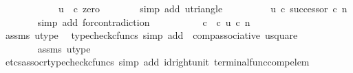 \begin{isabellebody}
\ \ \isamarkupfalse%
\ {\isacharminus}{\kern0pt}\isanewline
\ \ \ \ \isamarkupfalse%
\ {\isachardoublequoteopen}{\isasymt}\ {\isacharequal}{\kern0pt}\ u\ \ {\isasymcirc}\isactrlsub c\ zero{\isachardoublequoteclose}\isanewline
\ \ \ \ \ \ \isamarkupfalse%
\ {\isacharparenleft}{\kern0pt}simp\ add{\isacharcolon}{\kern0pt}\ u{\isacharunderscore}{\kern0pt}triangle{\isacharparenright}{\kern0pt}\isanewline
\ \ \ \ \isamarkupfalse%
\ \isamarkupfalse%
\ {\isachardoublequoteopen}{\isachardot}{\kern0pt}{\isachardot}{\kern0pt}{\isachardot}{\kern0pt}\ {\isacharequal}{\kern0pt}\ u\ {\isasymcirc}\isactrlsub c\ successor\ {\isasymcirc}\isactrlsub c\ n{\isachardoublequoteclose}\isanewline
\ \ \ \ \ \ \isamarkupfalse%
\ {\isacharparenleft}{\kern0pt}simp\ add{\isacharcolon}{\kern0pt}\ for{\isacharunderscore}{\kern0pt}contradiction{\isacharparenright}{\kern0pt}\isanewline
\ \ \ \ \isamarkupfalse%
\ \isamarkupfalse%
\ {\isachardoublequoteopen}{\isachardot}{\kern0pt}{\isachardot}{\kern0pt}{\isachardot}{\kern0pt}\ {\isacharequal}{\kern0pt}\ {\isacharparenleft}{\kern0pt}{\isasymf}\ {\isasymcirc}\isactrlsub c\ {\isasymbeta}\isactrlbsub {\isasymOmega}\isactrlesub {\isacharparenright}{\kern0pt}\ {\isasymcirc}\isactrlsub c\ u\ {\isasymcirc}\isactrlsub c\ n{\isachardoublequoteclose}\isanewline
\ \ \ \ \ \ \isamarkupfalse%
\ assms\ u{\isacharunderscore}{\kern0pt}type\ \isamarkupfalse%
\ {\isacharparenleft}{\kern0pt}typecheck{\isacharunderscore}{\kern0pt}cfuncs{\isacharcomma}{\kern0pt}\ simp\ add{\isacharcolon}{\kern0pt}\ \ comp{\isacharunderscore}{\kern0pt}associative{}\ u{\isacharunderscore}{\kern0pt}square{\isacharparenright}{\kern0pt}\isanewline
\ \ \ \ \isamarkupfalse%
\ \isamarkupfalse%
\ {\isachardoublequoteopen}{\isachardot}{\kern0pt}{\isachardot}{\kern0pt}{\isachardot}{\kern0pt}\ {\isacharequal}{\kern0pt}\ {\isasymf}{\isachardoublequoteclose}\isanewline
\ \ \ \ \ \ \isamarkupfalse%
\ assms\ u{\isacharunderscore}{\kern0pt}type\ \isamarkupfalse%
\ {\isacharparenleft}{\kern0pt}etcs{\isacharunderscore}{\kern0pt}assocr{\isacharcomma}{\kern0pt}typecheck{\isacharunderscore}{\kern0pt}cfuncs{\isacharcomma}{\kern0pt}\ simp\ add{\isacharcolon}{\kern0pt}\ id{\isacharunderscore}{\kern0pt}right{\isacharunderscore}{\kern0pt}unit{}\ terminal{\isacharunderscore}{\kern0pt}func{\isacharunderscore}{\kern0pt}comp{\isacharunderscore}{\kern0pt}elem{\isacharparenright}{\kern0pt}\isanewline

\end{isabellebody}
